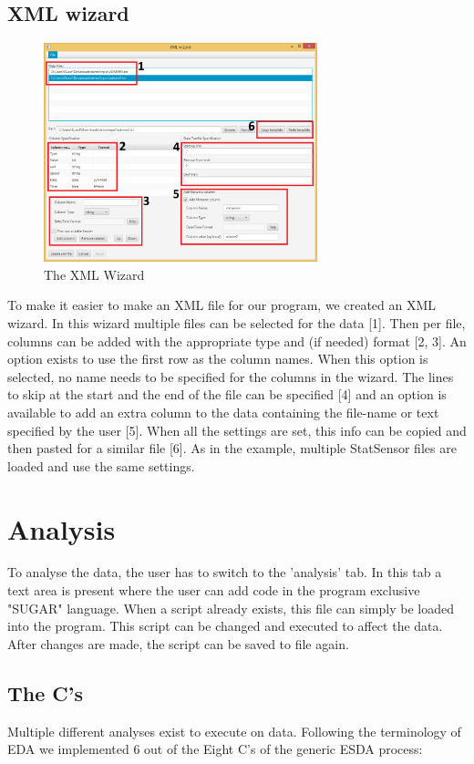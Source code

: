 \subsection{XML wizard}
\begin{figure}[h!]
\centering
\includegraphics[width=300px]{chapters/image-featureDescription/xmlwizard-highlight.png}
\caption{The XML Wizard}
\label{fig:xmlwizard}
\end{figure}
To make it easier to make an XML file for our program, we created an XML wizard. In this wizard multiple files can be selected for the data [1]. Then per file, columns can be added with the appropriate type and (if needed) format [2, 3]. An option exists to use the first row as the column names. When this option is selected, no name needs to be specified for the columns in the wizard. The lines to skip at the start and the end of the file can be specified [4] and an option is available to add an extra column to the data containing the file-name or text specified by the user [5]. When all the settings are set, this info can be copied and then pasted for a similar file [6]. As in the example, multiple StatSensor files are loaded and use the same settings. 
\section{Analysis}
To analyse the data, the user has to switch to the 'analysis' tab. In this tab a text area is present where the user can add code in the program exclusive "SUGAR" language. When a script already exists, this file can simply be loaded into the program. This script can be changed and executed to affect the data. After changes are made, the script can be saved to file again. 

\subsection{The C's}
Multiple different analyses exist to execute on data. Following the terminology of EDA we implemented 6 out of the Eight C's of the generic ESDA process:
